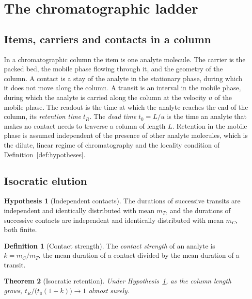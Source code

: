 \documentclass[11pt,a4paper]{article}
\newtheorem{theorem}{Theorem}[section]
\theoremstyle{definition}
\newtheorem{definition}[theorem]{Definition}
\newtheorem{hypothesis}{Hypothesis}
\theoremstyle{remark}
\begin{document}
\section{The chromatographic ladder}
\label{sec:chromatography}

\subsection{Items, carriers and contacts in a column}

In a chromatographic column the item is one analyte molecule.
The carrier is the packed bed, the mobile phase flowing through it, and the geometry of the column.
A contact is a stay of the analyte in the stationary phase, during which it does not move along the column.
A transit is an interval in the mobile phase, during which the analyte is carried along the column at the velocity $u$ of the mobile phase.
The readout is the time at which the analyte reaches the end of the column, its \emph{retention time} $t_R$.
The \emph{dead time} $t_0=L/u$ is the time an analyte that makes no contact needs to traverse a column of length $L$.
Retention in the mobile phase is assumed independent of the presence of other analyte molecules, which is the dilute, linear regime of chromatography and the locality condition of Definition~\ref{def:hypotheses}.

\subsection{Isocratic elution}

\begin{hypothesis}[Independent contacts]
\label{hyp:renewal}
The durations of successive transits are independent and identically distributed with mean $m_T$, and the durations of successive contacts are independent and identically distributed with mean $m_C$, both finite.
\end{hypothesis}

\begin{definition}[Contact strength]
\label{def:k}
The \emph{contact strength} of an analyte is $k=m_C/m_T$, the mean duration of a contact divided by the mean duration of a transit.
\end{definition}

\begin{theorem}[Isocratic retention]
\label{thm:isocratic}
Under Hypothesis~\ref{hyp:renewal}, as the column length grows, $t_R/\bigl(t_0(1+k)\bigr)\to1$ almost surely.
\end{theorem}
\end{document}
